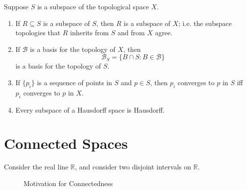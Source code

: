 \documentclass[notoc,notitlepage]{tufte-book}
\begin{document}
\begin{propo}\label{propo:other_properties_of_the_subspace_topology}
  Suppose $S$ is a subspace of the topological space $X$.
  \begin{enumerate}
    \item If $R \subseteq S$ is a subspace of $S$, then $R$ is a subspace of $X$; i.e. the subspace
      topologies that $R$ inherits from $S$ and from $X$ agree.
    \item If $\mathcal{B}$ is a basis for the topology of $X$, then
      \begin{equation*}
        \mathcal{B}_S = \{ B \cap S : B \in \mathcal{B} \}
      \end{equation*}
      is a basis for the topology of $S$.
    \item If $\{p_i\}$ is a sequence of points in $S$ and $p \in S$, then $p_i$ converges to $p$
      in $S$ iff $p_i$ converges to $p$ in $X$.
    \item Every subspace of a Hausdorff space is Hausdorff.
  \end{enumerate}
\end{propo}


\section{Connected Spaces}%
\label{sec:connected_spaces}

Consider the real line $\mathbb{R}$, and consider two disjoint intervals on $\mathbb{R}$.

\begin{figure}[ht]
  \centering
  \caption{Motivation for Connectedness}
  \label{fig:motivation_for_connectedness}
\end{figure}
\end{document}
